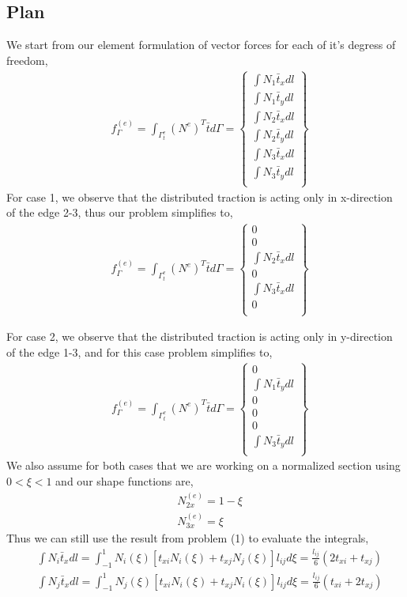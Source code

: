 \documentclass[a4paper]{memoir}
\begin{document}
\subsection{Plan}
We start from our element formulation of vector forces for each of it's degress of freedom, 
\begin{align*}
& f_{\Gamma}^{(e)} = \int_{\Gamma^e_t} (N^{e})^{T} \bar{t} d\Gamma = 
	\begin{Bmatrix}
		\int N_1\bar{t}_x dl \\
		\int N_1\bar{t}_y dl \\
		\int N_2\bar{t}_x dl \\
		\int N_2\bar{t}_y dl \\
		\int N_3\bar{t}_x dl \\
		\int N_3\bar{t}_y dl \\
	\end{Bmatrix}
\end{align*}
For case 1, we observe that the distributed traction is acting only in x-direction of the edge 2-3, thus our problem simplifies to,
\begin{align*}
& f_{\Gamma}^{(e)} = \int_{\Gamma^e_t} (N^{e})^{T} \bar{t} d\Gamma = 
	\begin{Bmatrix}
		0 \\
		0 \\
		\int N_2\bar{t}_x dl \\
		0 \\
		\int N_3\bar{t}_x dl \\
		0 \\
	\end{Bmatrix}
\end{align*}

For case 2, we observe that the distributed traction is acting only in y-direction of the edge 1-3, and for this case problem simplifies to,
\begin{align*}
& f_{\Gamma}^{(e)} = \int_{\Gamma^e_t} (N^{e})^{T} \bar{t} d\Gamma = 
	\begin{Bmatrix}
		0 \\
		\int N_1\bar{t}_y dl \\
		0 \\
		0 \\
		0 \\
		\int N_3\bar{t}_y dl \\
	\end{Bmatrix}
\end{align*}
We also assume for both cases that we are working on a normalized section using $0<\xi<1$ and our shape functions are,
\begin{align*}
	& N^{(e)}_{2x} = 1-\xi \\
	& N^{(e)}_{3x} = \xi
\end{align*}
Thus we can still use the result from problem (1) to evaluate the integrals,
\begin{align}
	& \int N_i\bar{t}_x dl = \int_{-1}^{1} N_i(\xi)[t_{xi}N_i(\xi)+t_{xj}N_j(\xi)]l_{ij}d\xi = \frac{l_{ij}}{6}(2t_{xi}+t_{xj}) \\
	& \int N_j\bar{t}_x dl = \int_{-1}^{1} N_j(\xi)[t_{xi}N_i(\xi)+t_{xj}N_i(\xi)]l_{ij}d\xi = \frac{l_{ij}}{6}(t_{xi}+2t_{xj})
\end{align}
\end{document}
